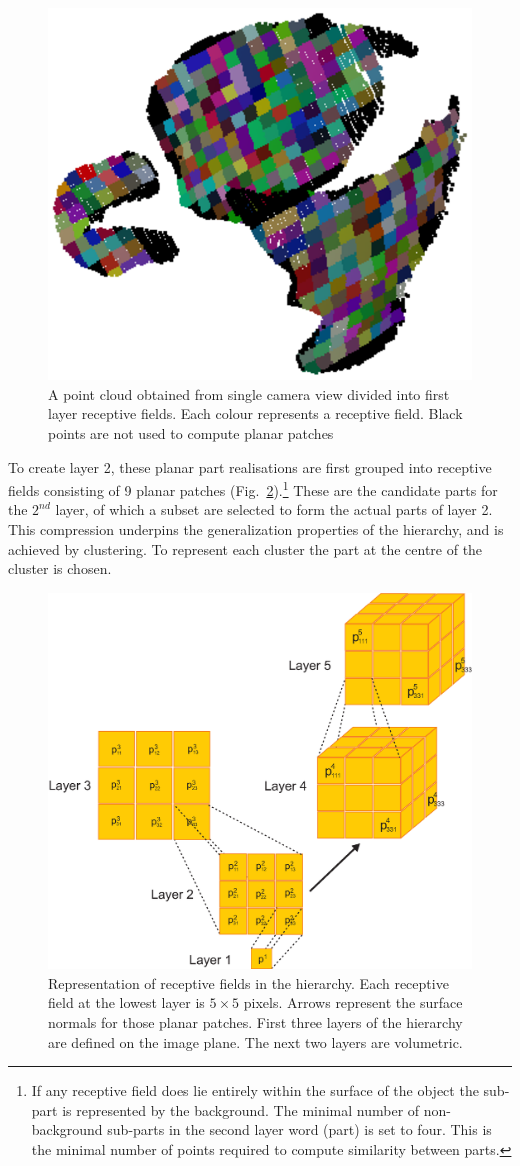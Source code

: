 \documentclass[letterpaper,10pt,conference]{ieeeconf}  %
\begin{document}
\begin{figure}[t]
 \centering
\includegraphics[width=0.5\columnwidth]{../images/recFields1.eps}
\caption{A point cloud obtained from single camera view divided into first layer receptive fields. Each colour represents a receptive field. Black points are not used to compute planar patches}
 \label{recFields1}
\end{figure}

To create layer 2, these planar part realisations are first grouped into receptive fields consisting of 9 planar patches (Fig.~\ref{word}).\footnote{If any receptive field does lie entirely within the surface of the object the sub-part is represented by the background. The minimal number of non-background sub-parts in the second layer word (part) is set to four. This is the minimal number of points required to compute similarity between parts.} These are the candidate parts for the $2^{nd}$ layer, of which a subset are selected to form the actual parts of layer 2. This compression underpins the generalization properties of the hierarchy, and is achieved by clustering. To represent each cluster the part at the centre of the cluster is chosen.

\begin{figure}[t]
 \centering
\includegraphics[width=0.9\columnwidth]{../images/hierarchy.eps}
\caption{Representation of receptive fields in the hierarchy. Each receptive field at the lowest layer is $5 \times 5$ pixels. Arrows represent the surface normals for those planar patches. First three layers of the hierarchy are defined on the image plane. The next two layers are volumetric.}
 \label{word}
\end{figure}
\end{document}
